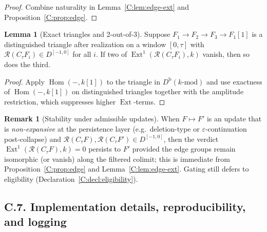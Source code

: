 \documentclass[11pt]{article}
\numberwithin{equation}{section}
\theoremstyle{plain}
\theoremstyle{definition}
\theoremstyle{remark}
\DeclareMathOperator{\Ext}{Ext}
\DeclareMathOperator{\Hom}{Hom}
\theoremstyle{plain}
\theoremstyle{definition}
\numberwithin{equation}{section}
\newtheorem{lemma}[theorem]{Lemma}
\theoremstyle{definition}
\newtheorem{remark}[theorem]{Remark}
\numberwithin{equation}{section}
\theoremstyle{plain}
\theoremstyle{definition}
\theoremstyle{remark}
\begin{document}
\begin{proof}
Combine naturality in Lemma~\ref{C:lem:edge-ext} and Proposition~\ref{C:prop:edge}.
\end{proof}

\begin{lemma}[Exact triangles and 2-out-of-3]\label{C:lem:2of3}
Suppose \(F_1\to F_2\to F_3\to F_1[1]\) is a distinguished triangle after realization on a window \([0,\tau]\) with \(\mathcal{R}(C_\tau F_i)\in D^{[-1,0]}\) for all \(i\).
If two of \(\Ext^1(\mathcal{R}(C_\tau F_i),k)\) vanish, then so does the third.
\end{lemma}

\begin{proof}
Apply \(\Hom(-,k[1])\) to the triangle in \(D^{\mathrm{b}}(k\text{-mod})\) and use exactness of \(\Hom(-,k[1])\) on distinguished triangles together with the amplitude restriction, which suppresses higher \(\Ext\)-terms.
\end{proof}

\begin{remark}[Stability under admissible updates]\label{C:rk:stability}
When \(F\mapsto F'\) is an update that is \emph{non-expansive} at the persistence layer (e.g.\ deletion-type or \(\varepsilon\)-continuation post-collapse) and \(\mathcal{R}(C_\tau F),\mathcal{R}(C_\tau F')\in D^{[-1,0]}\), then the verdict \(\Ext^1(\mathcal{R}(C_\tau F),k)=0\) persists to \(F'\) provided the edge groups remain isomorphic (or vanish) along the filtered colimit; this is immediate from Proposition~\ref{C:prop:edge} and Lemma~\ref{C:lem:edge-ext}.
Gating still defers to eligibility (Declaration~\ref{C:decl:eligibility}).
\end{remark}

\subsection*{C.7. Implementation details, reproducibility, and logging}
\end{document}
